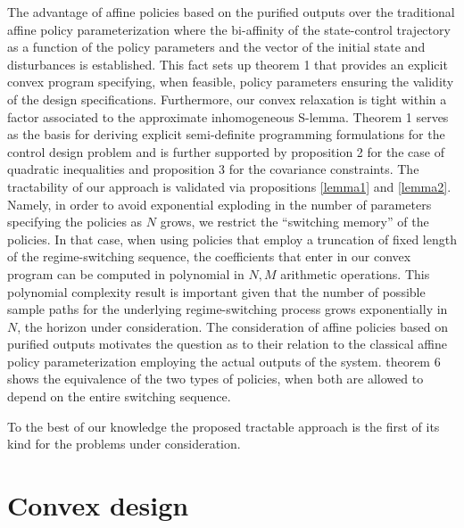 \documentclass[letterpaper,11pt]{article}
\begin{document}
The advantage of affine policies based on the purified outputs over the traditional affine policy parameterization
where  the bi-affinity of the state-control trajectory
as a function of the policy parameters and the vector of the initial state and disturbances is established. This fact  sets up
theorem 1 that provides an
explicit convex program specifying, when feasible, policy parameters ensuring the validity of the design specifications.   Furthermore,
our convex relaxation is tight within  a factor associated to the approximate inhomogeneous S-lemma.
Theorem 1  serves  as the basis for deriving explicit semi-definite programming formulations for the control
design problem and is further supported by proposition 2 for the case of quadratic inequalities  and proposition 3 for the covariance constraints.  
The tractability of our approach is validated via propositions \ref{lemma1} and \ref{lemma2}.
Namely, in order to avoid exponential exploding in the number of parameters specifying the policies as $N$ grows, 
we restrict the ``switching memory'' of the policies. In that case,  when using policies that employ a truncation of fixed length  of the regime-switching sequence, the
coefficients that enter in our
convex program can be computed in polynomial in $N, M$ arithmetic operations.
This polynomial complexity result is important given that the number of possible sample paths for the underlying regime-switching process grows exponentially in $N$, the horizon under consideration.
The consideration of affine policies based on purified outputs  motivates the question as to their relation to
the classical affine policy parameterization employing the actual outputs of the system.
theorem 6 shows the equivalence of the two types
of policies, when both are allowed to depend on the entire switching sequence.

To the best of our knowledge the proposed tractable approach is the first of its kind for the problems under consideration.


\section{Convex design}
\end{document}
